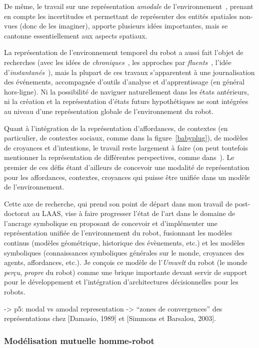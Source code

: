 \documentclass[a4paper]{article}
\begin{document}
De même, le travail sur une représentation \emph{amodale} de
l'environnement~\cite{Mavridis2006}, prenant en compte les incertitudes et
permettant de représenter des entités spatiales non-vues (donc de les imaginer),
apporte plusieurs idées importantes, mais se cantonne essentiellement aux
aspects spatiaux.

La représentation de l'environnement temporel du robot a aussi fait l'objet de
recherches (avec les idées de \emph{chroniques}~\cite{Ghallab1996}, les
approches par \emph{fluents}~\cite{mosenlechner2010becoming}, l'idée
d'\emph{instantanés}~\cite{Mavridis2006}), mais la plupart de ces travaux
s'apparentent à une journalisation des événements, accompagnée d'outils
d'analyse et d'apprentissage (en général hors-ligne). Ni la possibilité de
naviguer naturellement dans les états antérieurs, ni la création et la
représentation d'états futurs hypothétiques ne sont intégrées au niveau d'une
représentation globale de l'environnement du robot.

Quant à l'intégration de la représentation d'affordances, de contextes (en
particulier, de contextes sociaux, comme dans la figure~\ref{babyplug}), de
modèles de croyances et d'intentions, le travail reste largement à faire (on
peut toutefois mentionner la représentation de différentes perspectives, comme
dans~\cite{ros2010which}). Le premier de ces défis étant d'ailleurs de concevoir
une modalité de représentation pour les affordances, contextes, croyances qui
puisse être unifiée dans un modèle de l'environnement.

Cette axe de recherche, qui prend son point de départ dans mon travail de
post-doctorat au LAAS, vise à faire progresser l'état de l'art dans le domaine
de l'ancrage symbolique en proposant de concevoir et d'implémenter une
représentation unifiée de l'environnement du robot, fusionnant les modèles
continus (modèles géométrique, historique des évènements, etc.) et les modèles
symboliques (connaissances symboliques générales sur le monde, croyances des
agents, affordances, etc.). Je conçois ce modèle de l'\emph{Umwelt} du robot (le
monde \emph{perçu}, \emph{propre} du robot) comme une brique importante devant
servir de support pour le développement et l'intégration d'architectures
décisionnelles pour les robots.


\cite{pezzulo2012computational} -> p5: modal vs amodal representation -> ``zones
de convergences'' des représentations chez [Damasio, 1989] et [Simmons et Barsalou,
2003].

\subsubsection*{Modélisation mutuelle homme-robot}
\end{document}
